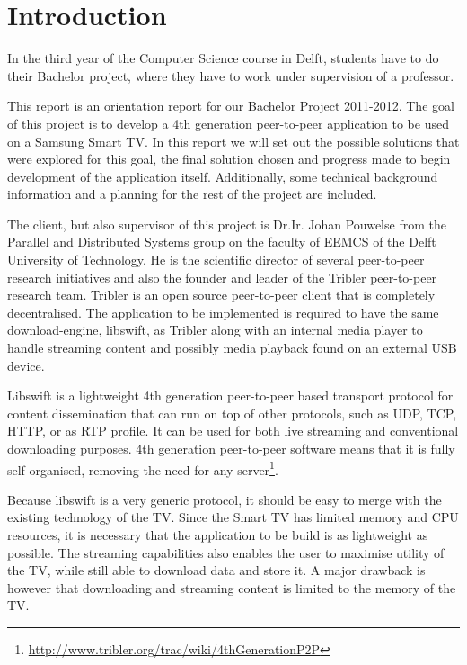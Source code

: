 \chapter{Introduction}

In the third year of the Computer Science course in Delft, students have to do their Bachelor project, 
where they have to work under supervision of a professor.

This report is an orientation report for our Bachelor Project 2011-2012.
The goal of this project is to develop a 4th generation peer-to-peer application to be used on a Samsung Smart TV.
In this report we will set out the possible solutions that were explored for this goal,
the final solution chosen and progress made to begin development of the application itself.
Additionally, some technical background information and a planning for the rest of the project are included.

The client, but also supervisor of this project is Dr.Ir. Johan Pouwelse from the Parallel and Distributed Systems group on the faculty of EEMCS of the Delft University of Technology.
He is the scientific director of several peer-to-peer research initiatives and also the founder and leader of the Tribler peer-to-peer research team.
Tribler is an open source peer-to-peer client that is completely decentralised.
The application to be implemented is required to have the same download-engine, libswift, as Tribler 
along with an internal media player to handle streaming content and possibly media playback found on an external USB device.

Libswift is a lightweight 4th generation peer-to-peer based transport protocol for content dissemination
that can run on top of other protocols, such as UDP, TCP, HTTP, or as RTP profile.
It can be used for both live streaming and conventional downloading purposes.
4th generation peer-to-peer software means that it is fully self-organised, removing the need for any server\footnote{\url{http://www.tribler.org/trac/wiki/4thGenerationP2P}}.

Because libswift is a very generic protocol, it should be easy to merge with the existing technology of the TV.
Since the Smart TV has limited memory and CPU resources, 
it is necessary that the application to be build is as lightweight as possible.
The streaming capabilities also enables the user to maximise utility of the TV,
while still able to download data and store it.
A major drawback is however that downloading and streaming content is limited to the memory of the TV.
